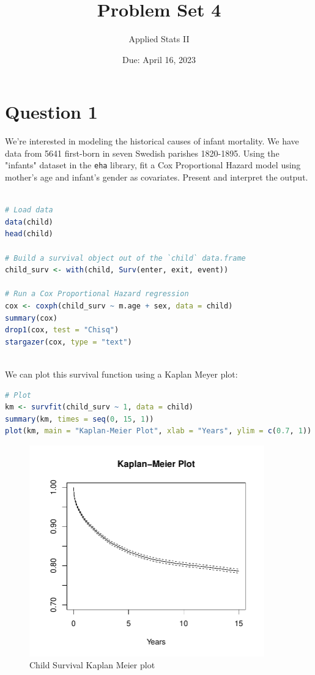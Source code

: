 \documentclass[12pt,letterpaper]{article}
\title{Problem Set 4}
\date{Due: April 16, 2023}
\author{Applied Stats II}
\begin{document}
	\maketitle
	\vspace{.25cm}
\section*{Question 1}
\vspace{.25cm}
\noindent We're interested in modeling the historical causes of infant mortality. We have data from 5641 first-born in seven Swedish parishes 1820-1895. Using the "infants" dataset in the \texttt{eha} library, fit a Cox Proportional Hazard model using mother's age and infant's gender as covariates. Present and interpret the output.


\begin{lstlisting}[language=R]

# Load data
data(child)
head(child)

# Build a survival object out of the `child` data.frame
child_surv <- with(child, Surv(enter, exit, event))

# Run a Cox Proportional Hazard regression
cox <- coxph(child_surv ~ m.age + sex, data = child)
summary(cox)
drop1(cox, test = "Chisq")
stargazer(cox, type = "text")
	
\end{lstlisting}

\noindent 
We can plot this survival function using a Kaplan Meyer plot: 

\begin{lstlisting}[language=R]
# Plot 
km <- survfit(child_surv ~ 1, data = child)
summary(km, times = seq(0, 15, 1))
plot(km, main = "Kaplan-Meier Plot", xlab = "Years", ylim = c(0.7, 1))
\end{lstlisting}

\begin{figure}
	\centering
	\includegraphics[width=4.0in]{KaplanMeier_ChildSurv.pdf}
	\caption{Child Survival Kaplan Meier plot}
	\label{Fig1}
\end{figure}
\end{document}
